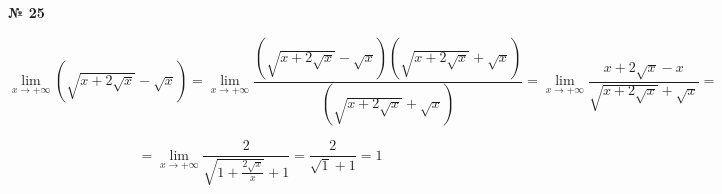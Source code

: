 \documentclass{article}
\begin{document}
\textbf{№ 25}

$$ \lim\limits_{x\to +\infty} \left( \sqrt{x+2\sqrt{x}} - \sqrt{x} \right) 
= \lim\limits_{x\to +\infty} \frac{\left( \sqrt{x+2\sqrt{x}} - \sqrt{x} \right) \left( \sqrt{x+2\sqrt{x}} + \sqrt{x} \right) }{\left( \sqrt{x+2\sqrt{x}} + \sqrt{x} \right) } 
= \lim\limits_{x\to +\infty} \frac{x+2\sqrt{x} - x}{\sqrt{x+2\sqrt{x}} + \sqrt{x}}
= $$

$$ = \lim\limits_{x\to +\infty} \frac{2}{\sqrt{1+\frac{2\sqrt{x}}{x}} + 1} 
= \frac{2}{\sqrt{1} + 1} 
= 1 $$
\end{document}
